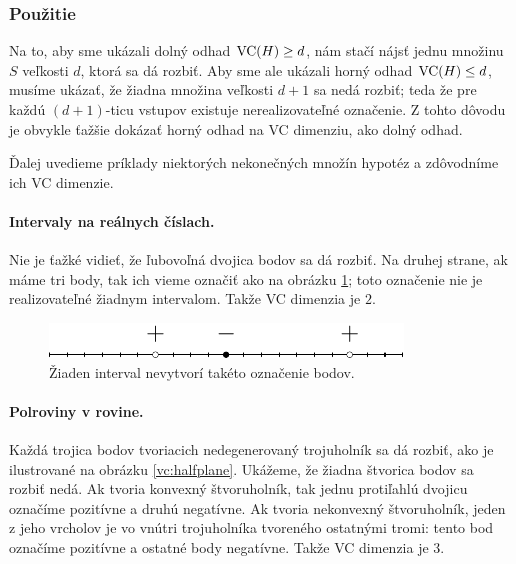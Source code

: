 \subsubsection{Použitie}

Na to, aby sme ukázali dolný odhad $\mathrm{VC}(H) \geq d$, nám stačí nájsť jednu
množinu $S$ veľkosti $d$, ktorá sa dá rozbiť. Aby sme ale ukázali horný
odhad $\mathrm{VC}(H) \leq d$, musíme ukázať, že žiadna množina veľkosti $d + 1$
sa nedá rozbiť; teda že pre každú $(d + 1)$-ticu vstupov existuje
nerealizovateľné označenie. Z tohto dôvodu je obvykle ťažšie dokázať
horný odhad na VC dimenziu, ako dolný odhad.

Ďalej uvedieme príklady niektorých nekonečných množín hypotéz a zdôvodníme
ich VC dimenzie.

\paragraph{Intervaly na reálnych číslach.} Nie je ťažké vidieť, že
ľubovoľná dvojica bodov sa dá rozbiť. Na druhej strane, ak máme tri
body, tak ich vieme označiť ako na obrázku \ref{vc:interval}; toto
označenie nie je realizovateľné žiadnym intervalom. Takže VC dimenzia
je $2$.

\begin{figure}
  \centering
  \includegraphics[scale=1]{obrazky/interval.pdf}
  \caption{Žiaden interval nevytvorí takéto označenie bodov.}
  \label{vc:interval}
\end{figure}

\paragraph{Polroviny v rovine.} Každá trojica bodov tvoriacich
nedegenerovaný trojuholník sa dá rozbiť, ako je ilustrované na
obrázku \ref{vc:halfplane}. Ukážeme, že žiadna štvorica bodov
sa rozbiť nedá. Ak tvoria konvexný štvoruholník, tak jednu protiľahlú 
dvojicu označíme pozitívne a druhú negatívne. Ak tvoria nekonvexný 
štvoruholník, jeden z jeho vrcholov je vo vnútri trojuholníka tvoreného 
ostatnými tromi: tento bod označíme pozitívne a ostatné body negatívne.
Takže VC dimenzia je $3$.


